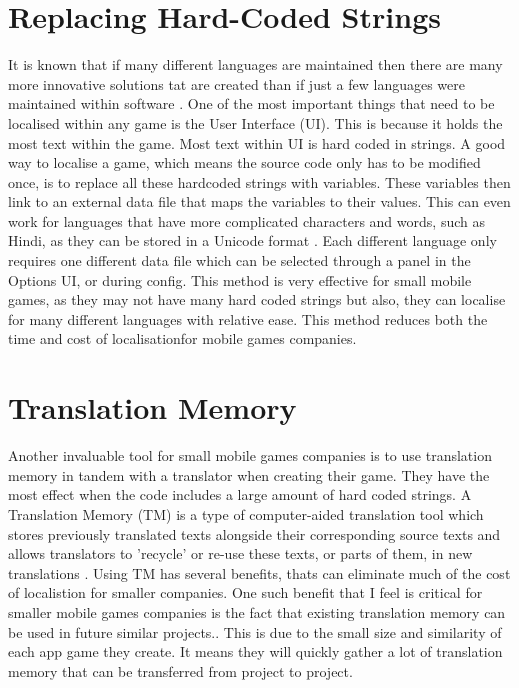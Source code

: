 \documentclass{scrartcl}
\begin{document}
\section{Replacing Hard-Coded Strings}
It is known that if many different languages are maintained then there are many more innovative solutions tat are created than if just a few languages were maintained within software \cite {yeo1996software}. One of the most important things that need to be localised within any game is the User Interface (UI). This is because it holds the most text within the game. Most text within UI is hard coded in strings. A good way to localise a game, which means the source code only has to be modified once, is to replace all these hardcoded strings with variables. These variables then link to an external data file that maps the variables to their values. This can even work for languages that have more complicated characters and words, such as Hindi, as they can be stored in a Unicode format \cite {tomar2014software}. Each different language only requires one different data file \cite {xia2013software} which can be selected through a panel in the Options UI, or during config. This method is very effective for small mobile games, as they may not have many hard coded strings but also, they can localise for many different languages with relative ease. This method reduces both the time and cost of localisationfor mobile games companies.

\section{Translation Memory}

Another invaluable tool for small mobile games companies is to use translation memory in tandem with a translator when creating their game. They have the most effect when the code includes a large amount of hard coded strings. A Translation Memory (TM) is a type of computer-aided translation tool which stores previously translated texts alongside their corresponding source texts and allows translators to 'recycle' or re-use these texts, or parts of them, in new translations \cite {sviridova2009software}. Using TM has several benefits, thats can eliminate much of the cost of localistion for smaller companies. One such benefit that I feel is critical for smaller mobile games companies is the fact that existing translation memory can be used in future similar projects.\cite {sviridova2009software}. This is due to the small size and similarity of each app game they create. It means they will quickly gather a lot of translation memory that can be transferred from project to project.
\end{document}
